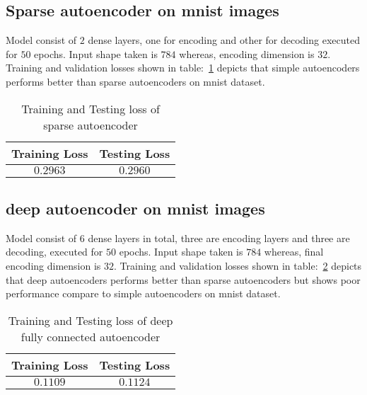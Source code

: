 \documentclass[12pt,a4paper,titlepage]{report}
\begin{document}
\subsection{Sparse autoencoder on mnist images}
Model consist of $2$ dense layers, one for encoding and other for decoding executed for $50$ epochs. Input shape taken is $784$ whereas, encoding dimension is $32$. Training and validation losses shown in table:~\ref{tab: Table-19} depicts that simple autoencoders performs better than sparse autoencoders on mnist dataset. 
\vspace{20pt}
\begin{table}[H]
\centering
\caption{Training and Testing loss of sparse autoencoder}
\label{tab: Table-19}
\begin{tabular}{c c}
\hline
\textbf{Training Loss} & \textbf{Testing Loss}\\
\hline
$0.2963$ & $0.2960$\\
\hline
\end{tabular}
\end{table}

\subsection{deep autoencoder on mnist images}
Model consist of $6$ dense layers in total, three are encoding layers and three are decoding, executed for $50$ epochs. Input shape taken is $784$ whereas, final encoding dimension is $32$. Training and validation losses shown in table:~\ref{tab: Table-20} depicts that deep autoencoders performs better than sparse autoencoders but shows poor performance compare to simple autoencoders on mnist dataset.
\vspace{20pt}
\begin{table}[H]
\centering
\caption{Training and Testing loss of deep fully connected autoencoder}
\label{tab: Table-20}
\begin{tabular}{c c}
\hline
\textbf{Training Loss} & \textbf{Testing Loss}\\
\hline
$0.1109$ & $0.1124$\\
\hline
\end{tabular}
\end{table}
\end{document}
